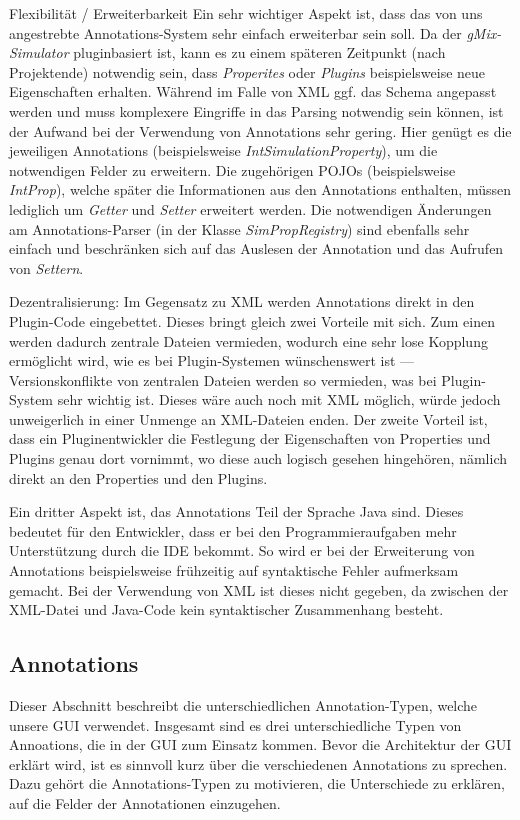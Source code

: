 \documentclass[a4paper, 11pt]{article} %
\begin{document}
Flexibilität / Erweiterbarkeit
Ein sehr wichtiger Aspekt ist, dass das von uns angestrebte Annotations-System sehr einfach erweiterbar sein soll. Da der \emph{gMix-Simulator} pluginbasiert ist, kann es zu einem späteren Zeitpunkt (nach Projektende) notwendig sein, dass \emph{Properites} oder \emph{Plugins} beispielsweise neue Eigenschaften erhalten. Während im Falle von XML ggf. das Schema angepasst werden und muss komplexere Eingriffe in das Parsing notwendig sein können, ist der Aufwand bei der Verwendung von Annotations sehr gering. Hier genügt es die jeweiligen Annotations (beispielsweise \emph{IntSimulationProperty}), um die notwendigen Felder zu erweitern. Die zugehörigen POJOs (beispielsweise \emph{IntProp}), welche später die Informationen aus den Annotations enthalten, müssen lediglich um \emph{Getter} und \emph{Setter} erweitert werden. Die notwendigen Änderungen am Annotations-Parser (in der Klasse \emph{SimPropRegistry}) sind ebenfalls sehr einfach und beschränken sich auf das Auslesen der Annotation und das Aufrufen von \emph{Settern}.

Dezentralisierung:
Im Gegensatz zu XML werden Annotations direkt in den Plugin-Code eingebettet. Dieses bringt gleich zwei Vorteile mit sich. Zum einen werden dadurch zentrale Dateien vermieden, wodurch eine sehr lose Kopplung ermöglicht wird, wie es bei Plugin-Systemen wünschenswert ist --- Versionskonflikte von zentralen Dateien werden so vermieden, was bei Plugin-System sehr wichtig ist. Dieses wäre auch noch mit XML möglich, würde jedoch unweigerlich in einer Unmenge an XML-Dateien enden. Der zweite Vorteil ist, dass ein Pluginentwickler die Festlegung der Eigenschaften von Properties und Plugins genau dort vornimmt, wo diese auch logisch gesehen hingehören, nämlich direkt an den Properties und den Plugins. 

Ein dritter Aspekt ist, das Annotations Teil der Sprache Java sind. Dieses bedeutet für den Entwickler, dass er bei den Programmieraufgaben mehr Unterstützung durch die IDE bekommt. So wird er bei der Erweiterung von Annotations beispielsweise frühzeitig auf syntaktische Fehler aufmerksam gemacht. Bei der Verwendung von XML ist dieses nicht gegeben, da zwischen der XML-Datei und Java-Code kein syntaktischer Zusammenhang besteht. 



\subsection{Annotations} %
\label{sub:annotations}
Dieser Abschnitt beschreibt die unterschiedlichen Annotation-Typen, welche unsere GUI verwendet. Insgesamt sind es drei unterschiedliche Typen von Annoations, die in der GUI zum Einsatz kommen. Bevor die Architektur der GUI erklärt wird, ist es sinnvoll kurz über die verschiedenen Annotations zu sprechen. Dazu gehört die Annotations-Typen zu motivieren, die Unterschiede zu erklären, auf die Felder der Annotationen einzugehen.
\end{document}
